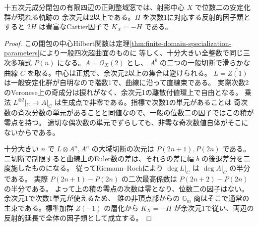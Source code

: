 \begin{corollary}\label{cor:index-four-no-divisorial-inertia}
十五次元成分閉包の有限四辺の正則整域窓では、射影中心 $X$ で位数二の安定化群が現れる軌跡の
余次元は2以上である。$H$ を次数1に対応する反射的因子類とすると $2H$ は豊富なCartier因子で
$K_X=-H$ である。
\end{corollary}
\begin{proof}
この閉包の中心Hilbert関数は定理\ref{thm:finite-domain-specialization-parameters}により一般四次超曲面のものに
等しく、十分大きい全整数で同じ三次多項式 $P(n)$ になる。$A=\mathcal O_X(2)$ とし、
$A^b$ の二つの一般切断で滑らかな曲線 $C$ を取る。中心は正規で、余次元2以上の集合は避けられる。
$L=\widetilde{Z(1)}$ は一般安定化群が自明なので階数1で、曲線に沿って直線束である。
実際次数2のVeronese上の奇成分は捩れがなく、余次元1の離散付値環上で自由となる。
乗法 $L^{\otimes2}|_C\to A|_C$ は生成点で非零である。指標で次数1の単元があることは
奇次数の斉次分数の単元があることと同値なので、一般の位数二の因子ではこの積が零点を持つ。
適切な偶次数の単元でずらしても、非零な奇次数値自体がそこにないからである。

十分大きい $n$ で $L\otimes A^n,A^n$ の大域切断の次元は $P(2n+1),P(2n)$ である。
二切断で制限すると曲線上のEuler数の差は、それらの差に幅 $b$ の後退差分を二度施したものになる。
従ってRiemann--Rochにより $\deg L|_C$ は $\deg A|_C$ の半分である。
実際 $P(2n+1)-P(2n)$ の二次最高係数は $P(2n+2)-P(2n)$ の半分である。
よって上の積の零点の次数は零となり、位数二の因子はない。余次元1で次数1単元が使えるため、
錐の非頂点部からの $\mathbb G_m$ 商はそこで通常の主束である。標準加群 $Z(-1)$ の層化から
$K_X=-H$ が余次元1で従い、両辺の反射的延長で全体の因子類として成立する。
\end{proof}
